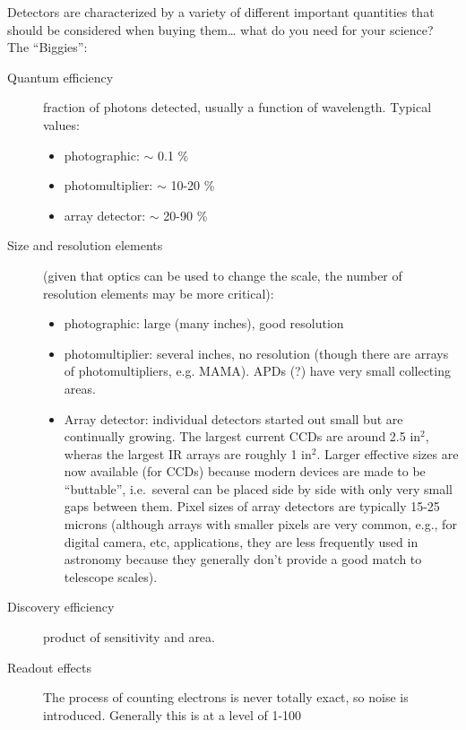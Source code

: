 \documentclass[12pt]{article}
\begin{document}
Detectors are characterized by a variety of different important
quantities that should be considered when buying them\ldots
what do you need for your science? The ``Biggies'':
\begin{description}
    \item [Quantum efficiency] fraction of photons detected, usually
        a function of wavelength. Typical values:
        \begin{itemize}
            \item photographic: $\sim$ 0.1 \%
            \item photomultiplier: $\sim$ 10-20 \%
            \item array detector: $\sim$ 20-90 \%
        \end{itemize}
    \item [Size and resolution elements] (given that optics can be used
        to change the scale, the number of resolution elements may be
        more critical):
        \begin{itemize}
            \item photographic: large (many inches), good resolution
            \item photomultiplier: several inches, no resolution
                (though there are arrays of photomultipliers, e.g.
                MAMA). APDs (?) have very small collecting areas.
            \item Array detector: individual detectors started out
                small but are continually growing. The largest current
                CCDs are around 2.5 in$^{2}$, wheras the largest IR
                arrays are roughly 1 in$^{2}$. Larger effective sizes
                are now available (for CCDs) because modern devices
                are made to be ``buttable'', i.e.\ several can be
                placed side by side with only very small gaps between
                them. Pixel sizes of array detectors are typically
                15-25 microns (although arrays with smaller pixels are
                very common, e.g., for digital camera, etc,
                applications, they are less frequently used in
                astronomy because they generally don't provide a good
                match to telescope scales).
        \end{itemize}
    \item [Discovery efficiency] product of sensitivity and area.
    \item [Readout effects] The process of counting electrons is never totally
        exact, so noise is introduced. Generally this is at a level of 1-100

\end{description}
\end{document}
